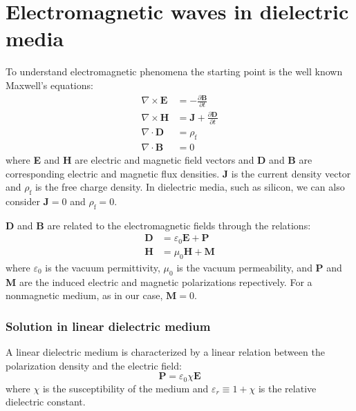 \documentclass[12pt,a4paper,twoside]{article}
\begin{document}
\section{Electromagnetic waves in dielectric media}

To understand electromagnetic phenomena the starting point is the well known Maxwell's equations:
\begin{subequations}
\begin{align}
	\nabla \times \textbf{E} &= -\frac{\partial \textbf{B}}{\partial t} \\
	\nabla \times \textbf{H} &= \textbf{J} + \frac{\partial \textbf{D}}{\partial t} \\
	\nabla \cdot \textbf{D} &= \rho_{\mathrm{f}} \\
	\nabla \cdot \textbf{B} &= 0
\end{align}
\label{eq_maxwell}
\end{subequations}
where \textbf{E} and \textbf{H} are electric and magnetic field vectors and \textbf{D} and \textbf{B} are corresponding electric and magnetic flux densities. \textbf{J} is the current density vector and $\rho_{\mathrm{f}}$ is the free charge density.
In dielectric media, such as silicon, we can also consider $\textbf{J} = 0$ and $\rho_\mathrm{f} = 0$.

\textbf{D} and \textbf{B} are related to the electromagnetic fields through the relations:
\begin{subequations}
\begin{align}
	\textbf{D} &= \varepsilon_0 \textbf{E} + \textbf{P} \\
	\textbf{H} &= \mu_0 \textbf{H} + \textbf{M}	
\end{align}
\end{subequations}
where $\varepsilon_0$ is the vacuum permittivity, $\mu_0$ is the vacuum permeability, and \textbf{P} and \textbf{M} are the induced electric and magnetic polarizations repectively.
For a nonmagnetic medium, as in our case, $\textbf{M} = 0$.

\subsubsection*{Solution in linear dielectric medium}
A linear dielectric medium is characterized by a linear relation between the polarization density and the electric field:
\begin{equation}
\textbf{P} = \varepsilon_0 \chi \textbf{E}
\end{equation}
where $\chi$ is the susceptibility of the medium and $\varepsilon_r \equiv 1+\chi$ is the relative dielectric constant.
\end{document}
